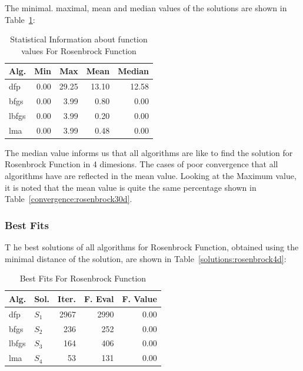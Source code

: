 \documentclass[conference]{IEEEtran}
\begin{document}
The minimal. maximal, mean and median values of the solutions are shown in Table~\ref{function_values:rosenbrock30d}:

\begin{table}[H]
\centering
\caption{Statistical Information about function values For Rosenbrock Function}
\label{function_values:rosenbrock30d}
\begin{tabular}{lrrrr}
\toprule
 Alg. &  Min &   Max &  Mean &  Median \\
\midrule
  dfp & 0.00 & 29.25 & 13.10 &   12.58 \\
 bfgs & 0.00 &  3.99 &  0.80 &    0.00 \\
lbfgs & 0.00 &  3.99 &  0.20 &    0.00 \\
  lma & 0.00 &  3.99 &  0.48 &    0.00 \\
\bottomrule
\end{tabular}
\end{table}

The median value informs us that all algorithms are like to find the solution
for Rosenbrock Function in 4 dimesions. The cases of poor convergence that all algorithms
have are reflected in the mean value. Looking at the Maximum value, it is noted that the mean value is
quite the same percentage shown in Table~\ref{convergence:rosenbrock30d}.

\subsubsection{Best Fits}
\label{bestfitsrosenbrock30d30D}

T
he best solutions of all algorithms for Rosenbrock Function, obtained using the minimal
distance of the solution, are shown in Table~\ref{solutions:rosenbrock4d}:

\begin{table}[H]
\centering
\caption{Best Fits For Rosenbrock Function}
\label{solutions:rosenbrock30d}
\begin{tabular}{llrrr}
\toprule
 Alg. &    Sol. &  Iter. &  F. Eval &  F. Value \\
\midrule
  dfp & $S_{1}$ &   2967 &     2990 &      0.00 \\
 bfgs & $S_{2}$ &    236 &      252 &      0.00 \\
lbfgs & $S_{3}$ &    164 &      406 &      0.00 \\
  lma & $S_{4}$ &     53 &      131 &      0.00 \\
\bottomrule
\end{tabular}
\end{table}
\end{document}
